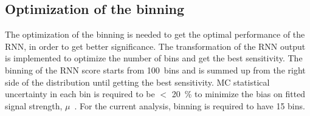 \subsection{Optimization of the binning}
The optimization of the binning is needed to get the optimal performance of the RNN, in order to get better significance. 
The transformation of the RNN output \cite{ATL-PHYS-PUB-2019-009} is implemented to optimize the number of bins and get the best sensitivity.
The binning of the RNN score starts from 100~bins and is summed up from the right side of the distribution until getting the best sensitivity. 
MC statistical uncertainty in each bin is required to be $<$ 20~\% to minimize the bias on fitted signal strength, $\mu$~\cite{ATL-PHYS-PUB-2019-009}. 
For the current analysis, binning is required to have 15 bins.
